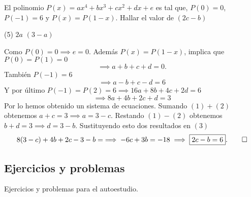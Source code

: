 \begin{example}
    El polinomio $P(x) = ax^4 + bx^3 + cx^2 + dx + e$ es tal que, $P(0) = 0$, $P(-1) = 6$ y $P(x) = P(1 - x)$.
    Hallar el valor de $(2c - b)$
    \begin{tasks}[label=\Alph*)](5)
        \task $2a$
        \task $(3 - a)$
    \end{tasks}
\end{example}

\begin{solution}
    Como $P(0) = 0 \implies e = 0$.
    Además $P(x) = P(1 - x)$, implica que $P(0) = P(1) = 0$
    \begin{equation}
        \implies a + b + c + d = 0.
    \end{equation}
    También $P(-1) = 6$
    \begin{equation}
        \implies a - b + c - d = 6
    \end{equation}
    Y por último $P(-1) = P(2) = 6 \implies 16a + 8b + 4c + 2d = 6$
    \begin{equation}
        \implies 8a + 4b + 2c + d = 3
    \end{equation}
    Por lo hemos obtenido un sistema de ecuaciones.
    Sumando $(1) + (2)$ obtenemos $a + c = 3 \implies a = 3 - c$.
    Restando $(1) - (2)$ obtenemos $b + d = 3 \implies d = 3 - b$.
    Sustituyendo esto dos resultados en $(3)$
    \[
        8(3 - c) + 4b + 2c - 3 - b = \implies -6c + 3b = -18 \implies \boxed{2c - b = 6}. \qedhere
    \]
\end{solution}



\subsection{Ejercicios y problemas}
Ejercicios y problemas para el autoestudio.

